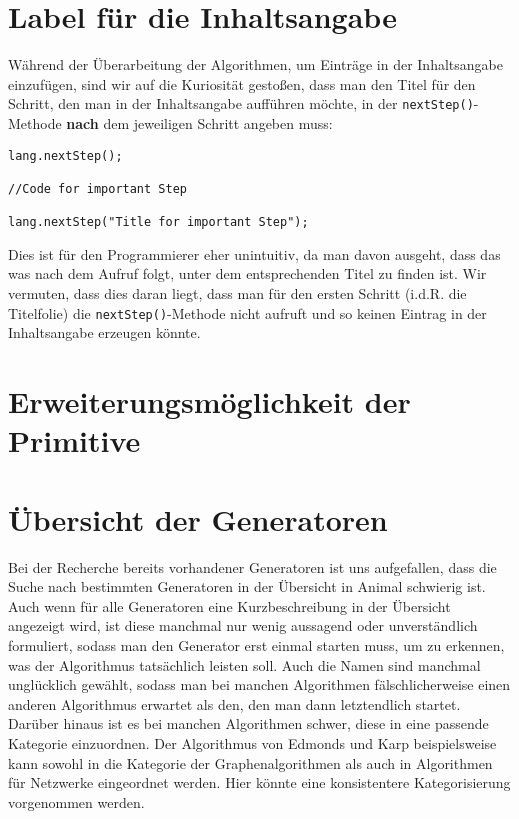 \documentclass[solution]{tudreport}
\begin{document}
		\section{Label für die Inhaltsangabe}
			Während der Überarbeitung der Algorithmen, um Einträge in der Inhaltsangabe einzufügen, sind wir auf die Kuriosität gestoßen, dass man den Titel für den Schritt, den man in der Inhaltsangabe aufführen möchte, in der \lstinline!nextStep()!-Methode \textbf{nach} dem jeweiligen Schritt angeben muss:
			\begin{lstlisting}[frame=single, caption = Code-Beispiel für die Angabe des Titels nach dem Code]
lang.nextStep();

//Code for important Step

lang.nextStep("Title for important Step");
			\end{lstlisting}
			Dies ist für den Programmierer eher unintuitiv, da man davon ausgeht, dass das was nach dem Aufruf folgt, unter dem entsprechenden Titel zu finden ist. Wir vermuten, dass dies daran liegt, dass man für den ersten Schritt (i.d.R. die Titelfolie) die \lstinline!nextStep()!-Methode nicht aufruft und so keinen Eintrag in der Inhaltsangabe erzeugen könnte.
		
		\section{Erweiterungsmöglichkeit der Primitive}
		
		\section{Übersicht der Generatoren}
			Bei der Recherche bereits vorhandener Generatoren ist uns aufgefallen, dass die Suche nach bestimmten Generatoren in der Übersicht in Animal schwierig ist. Auch wenn für alle Generatoren eine Kurzbeschreibung in der Übersicht angezeigt wird, ist diese manchmal nur wenig aussagend oder unverständlich formuliert, sodass man den Generator erst einmal starten muss, um zu erkennen, was der Algorithmus tatsächlich leisten soll. Auch die Namen sind manchmal unglücklich gewählt, sodass man bei manchen Algorithmen fälschlicherweise einen anderen Algorithmus erwartet als den, den man dann letztendlich startet.\\
			Darüber hinaus ist es bei manchen Algorithmen schwer, diese in eine passende Kategorie einzuordnen. Der Algorithmus von Edmonds und Karp beispielsweise kann sowohl in die Kategorie der Graphenalgorithmen als auch in Algorithmen für Netzwerke eingeordnet werden. Hier könnte eine konsistentere Kategorisierung vorgenommen werden.
	
\end{document}

